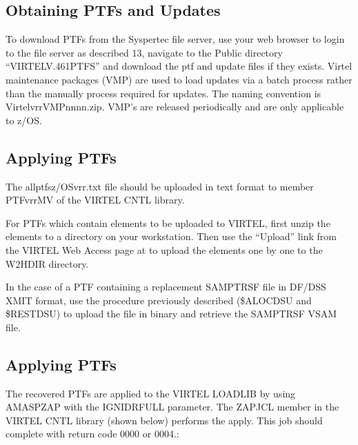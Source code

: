 \documentclass[letterpaper,10pt,english]{sphinxmanual}
\begin{document}
\subsection{Obtaining PTFs and Updates}
\label{\detokenize{Installation_Guide:obtaining-ptfs-and-updates}}
\sphinxAtStartPar
To download PTFs from the Syspertec file server, use your web browser to login to the file server as described 13, navigate to the Public directory “VIRTEL\sphinxhyphen{}V.461\sphinxhyphen{}PTFS” and download the ptf and update files if they exists. Virtel maintenance packages (VMP) are used to load updates via a batch process rather than the manually process required for updates. The naming convention is VirtelvrrVMPnnnn.zip. VMP’s are released periodically and are only applicable to z/OS.


\subsection{Applying PTFs}
\label{\detokenize{Installation_Guide:applying-ptfs}}
\sphinxAtStartPar
The allptfs\sphinxhyphen{}z/OSvrr.txt file should be uploaded in text format to member PTFvrrMV of the VIRTEL CNTL library.

\sphinxAtStartPar
For PTFs which contain elements to be uploaded to VIRTEL, first unzip the elements to a directory on your workstation. Then use the “Upload” link from the VIRTEL Web Access page at  to upload the elements one by one to the W2H\sphinxhyphen{}DIR directory.

\sphinxAtStartPar
In the case of a PTF containing a replacement SAMPTRSF file in DF/DSS XMIT format, use the procedure previously described (\$ALOCDSU and \$RESTDSU) to upload the file in binary and retrieve the SAMPTRSF VSAM file.


\subsection{Applying PTFs}
\label{\detokenize{Installation_Guide:id1}}
\sphinxAtStartPar
The recovered PTFs are applied to the VIRTEL LOADLIB by using AMASPZAP with the IGNIDRFULL parameter. The ZAPJCL member in the VIRTEL CNTL library (shown below) performs the apply. This job should complete with return code 0000 or 0004.:
\end{document}
